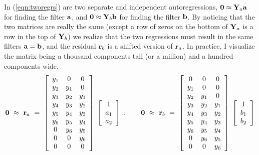 \par
In (\ref{eqn:tworegrs}) are two separate and independent autoregressions,
$\bold 0\approx\bold Y_a\bold a$
for finding the filter $\bold a$,
and
$\bold 0\approx\bold Y_b\bold b$
for finding the filter $\bold b$.
By noticing that the two matrices are really the same
(except a row of zeros on the bottom of
$\bold Y_a$
is a row in the top of
$\bold Y_b$)
we realize that the two regressions must result in the same filters
$\bold a =\bold b$,
and the residual $\bold r_b$ is a shifted version of $\bold r_a$.
In practice, I visualize the matrix being a thousand components tall
(or a million)
and a hundred components wide.
\begin{equation}
\bold 0
\ \approx\ \bold r_a \ =\ 
        \left[ 
        \begin{array}{ccc}
          y_1 & 0   & 0    \\
          y_2 & y_1 & 0    \\
          y_3 & y_2 & y_1  \\
          y_4 & y_3 & y_2  \\
          y_5 & y_4 & y_3  \\
          y_6 & y_5 & y_4  \\
          0   & y_6 & y_5  \\
          0   & 0   & y_6  \\
          0   & 0   & 0  
          \end{array} \right] 
        \; \left[ 
        \begin{array}{c}
          1   \\ 
          a_1 \\ 
          a_2 \end{array} \right]
\ ; \quad\quad
\bold 0
\ \approx\ \bold r_b \ =\ 
        \left[ 
        \begin{array}{ccc}
          0   & 0   & 0    \\
          y_1 & 0   & 0    \\
          y_2 & y_1 & 0    \\
          y_3 & y_2 & y_1  \\
          y_4 & y_3 & y_2  \\
          y_5 & y_4 & y_3  \\
          y_6 & y_5 & y_4  \\
          0   & y_6 & y_5  \\
          0   & 0   & y_6 
          \end{array} \right] 
        \; \left[ 
        \begin{array}{c}
          1   \\ 
          b_1 \\ 
          b_2 \end{array} \right]
\label{eqn:tworegrs}
\end{equation}
